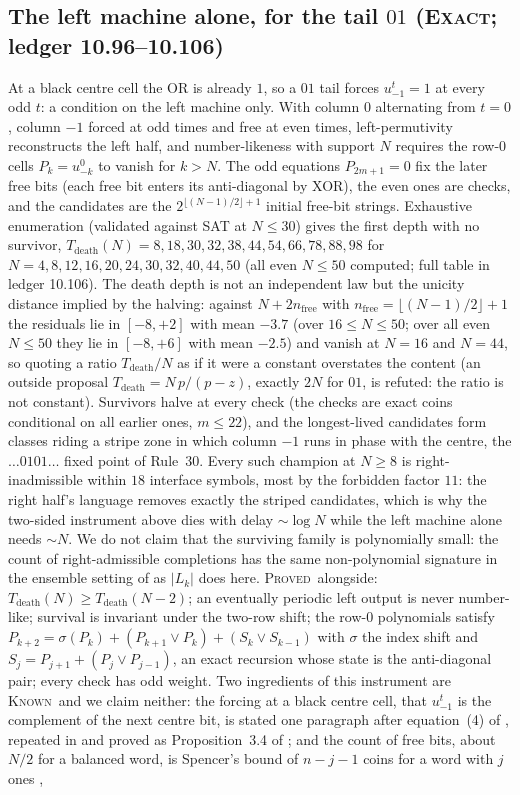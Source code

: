 \documentclass[11pt]{article}
\theoremstyle{definition}
\theoremstyle{remark}
\newcommand{\PROVED}{\textsc{Proved}}
\newcommand{\EXACT}{\textsc{Exact}}
\newcommand{\KNOWN}{\textsc{Known}}
\begin{document}
\subsection*{The left machine alone, for the tail $01$ (\EXACT; ledger 10.96--10.106)}
At a black centre cell the OR is already $1$, so a $01$ tail forces $u^t_{-1}=1$ at every odd $t$: a condition on the left machine only. With column $0$ alternating from $t=0$, column $-1$ forced at odd times and free at even times, left-permutivity reconstructs the left half, and number-likeness with support $N$ requires the row-$0$ cells $P_k=u^0_{-k}$ to vanish for $k>N$. The odd equations $P_{2m+1}=0$ fix the later free bits (each free bit enters its anti-diagonal by XOR), the even ones are checks, and the candidates are the $2^{\lfloor(N-1)/2\rfloor+1}$ initial free-bit strings. Exhaustive enumeration (validated against SAT at $N\le30$) gives the first depth with no survivor, $T_{\mathrm{death}}(N)=8,18,30,32,38,44,54,66,78,88,98$ for $N=4,8,12,16,20,24,30,32,40,44,50$ (all even $N\le50$ computed; full table in ledger 10.106). The death depth is not an independent law but the unicity distance implied by the halving: against $N+2n_{\mathrm{free}}$ with $n_{\mathrm{free}}=\lfloor(N-1)/2\rfloor+1$ the residuals lie in $[-8,+2]$ with mean $-3.7$ (over $16\le N\le50$; over all even $N\le50$ they lie in $[-8,+6]$ with mean $-2.5$) and vanish at $N=16$ and $N=44$, so quoting a ratio $T_{\mathrm{death}}/N$ as if it were a constant overstates the content (an outside proposal $T_{\mathrm{death}}=N\,p/(p-z)$, exactly $2N$ for $01$, is refuted: the ratio is not constant). Survivors halve at every check (the checks are exact coins conditional on all earlier ones, $m\le22$), and the longest-lived candidates form classes riding a stripe zone in which column $-1$ runs in phase with the centre, the $\ldots0101\ldots$ fixed point of Rule~30. Every such champion at $N\ge8$ is right-inadmissible within $18$ interface symbols, most by the forbidden factor $11$: the right half's language removes exactly the striped candidates, which is why the two-sided instrument above dies with delay $\sim\log N$ while the left machine alone needs $\sim N$. We do not claim that the surviving family is polynomially small: the count of right-admissible completions has the same non-polynomial signature in the ensemble setting of \cite[Table~1]{MS} as $|L_k|$ does here. \PROVED\ alongside: $T_{\mathrm{death}}(N)\ge T_{\mathrm{death}}(N-2)$; an eventually periodic left output is never number-like; survival is invariant under the two-row shift; the row-$0$ polynomials satisfy $P_{k+2}=\sigma(P_k)+(P_{k+1}\vee P_k)+(S_k\vee S_{k-1})$ with $\sigma$ the index shift and $S_j=P_{j+1}+(P_j\vee P_{j-1})$, an exact recursion whose state is the anti-diagonal pair; every check has odd weight. Two ingredients of this instrument are \KNOWN\ and we claim neither: the forcing at a black centre cell, that $u^t_{-1}$ is the complement of the next centre bit, is stated one paragraph after equation~(4) of \cite{MS}, repeated in \cite[p.~1087]{NKS} and proved as Proposition~3.4 of \cite{Spencer}; and the count of free bits, about $N/2$ for a balanced word, is Spencer's bound of $n-j-1$ coins for a word with $j$ ones \cite[\S3.2]{Spencer}, 
\end{document}
